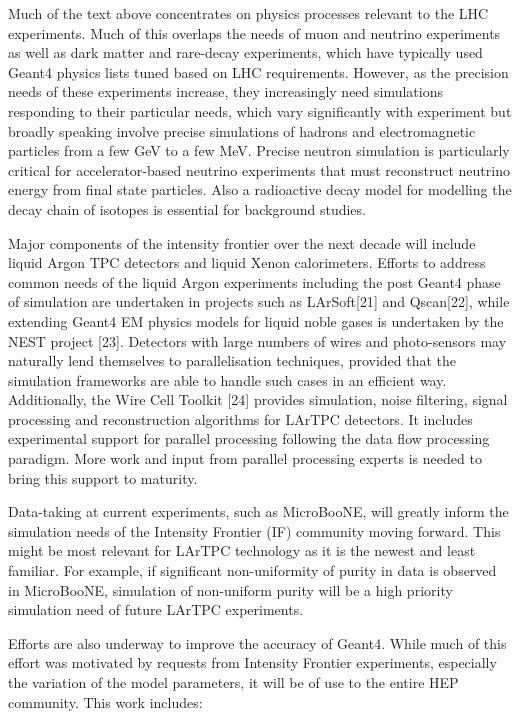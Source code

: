 \documentclass[12pt,a4paper]{article}
\begin{document}
Much of the text above concentrates on physics processes relevant to the
LHC experiments. Much of this overlaps the needs of muon and neutrino
experiments as well as dark matter and rare-decay experiments, which
have typically used Geant4 physics lists tuned based on LHC
requirements. However, as the precision needs of these experiments
increase, they increasingly need simulations responding to their
particular needs, which vary significantly with experiment but broadly
speaking involve precise simulations of hadrons and electromagnetic
particles from a few GeV to a few MeV. Precise neutron simulation is
particularly critical for accelerator-based neutrino experiments that
must reconstruct neutrino energy from final state particles. Also a
radioactive decay model for modelling the decay chain of isotopes is
essential for background studies.

Major components of the intensity frontier over the next decade will
include liquid Argon TPC detectors and liquid Xenon calorimeters.
Efforts to address common needs of the liquid Argon experiments
including the post Geant4 phase of simulation are undertaken in projects
such as LArSoft{[}21{]} and Qscan{[}22{]}, while extending Geant4 EM
physics models for liquid noble gases is undertaken by the NEST project
{[}23{]}. Detectors with large numbers of wires and photo-sensors may
naturally lend themselves to parallelisation techniques, provided that
the simulation frameworks are able to handle such cases in an efficient
way. Additionally, the Wire Cell Toolkit {[}24{]} provides simulation,
noise filtering, signal processing and reconstruction algorithms for
LArTPC detectors. It includes experimental support for parallel
processing following the data flow processing paradigm. More work and
input from parallel processing experts is needed to bring this support
to maturity.

Data-taking at current experiments, such as MicroBooNE, will greatly
inform the simulation needs of the Intensity Frontier (IF) community
moving forward. This might be most relevant for LArTPC technology as it
is the newest and least familiar. For example, if significant
non-uniformity of purity in data is observed in MicroBooNE, simulation
of non-uniform purity will be a high priority simulation need of future
LArTPC experiments.

Efforts are also underway to improve the accuracy of Geant4. While much
of this effort was motivated by requests from Intensity Frontier
experiments, especially the variation of the model parameters, it will
be of use to the entire HEP community. This work includes:
\end{document}
